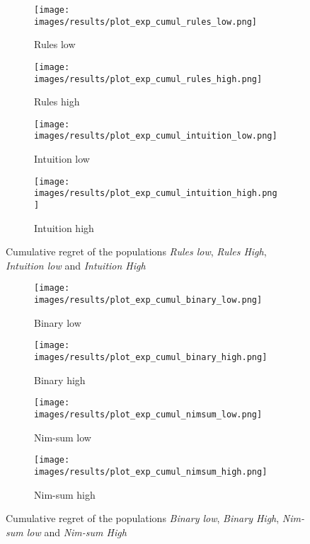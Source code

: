 \begin{figure}[ht]
	\begin{subfigure}{0.49\linewidth}
	\centering
	\texttt{[image: images/results/plot\_exp\_cumul\_rules\_low.png]}
	\caption{Rules low}
	\label{fig:exp_cumul_rules_low}
	\end{subfigure}
	\hfill
	\begin{subfigure}{0.49\linewidth}
	\centering
	\texttt{[image: images/results/plot\_exp\_cumul\_rules\_high.png]}
	\caption{Rules high}
	\label{fig:exp_cumul_rules_high}
	\end{subfigure}
	\begin{subfigure}{0.49\linewidth}
	\centering
	\texttt{[image: images/results/plot\_exp\_cumul\_intuition\_low.png]}
	\caption{Intuition low}
	\label{fig:exp_cumul_intuition_low}
	\end{subfigure}
	\hfill
	\begin{subfigure}{0.49\linewidth}
	\centering
	\texttt{[image: images/results/plot\_exp\_cumul\_intuition\_high.png]}
	\caption{Intuition high}
	\label{fig:exp_cumul_intuition_high}
	\end{subfigure}
	\caption{Cumulative regret of the populations \emph{Rules low}, \emph{Rules
	High}, \emph{Intuition low} and \emph{Intuition High}}
	\label{fig:exp_cumul1}
\end{figure}
\begin{figure}[ht]
	\begin{subfigure}{0.49\linewidth}
	\centering
	\texttt{[image: images/results/plot\_exp\_cumul\_binary\_low.png]}
	\caption{Binary low}
	\label{fig:exp_cumul_binary_low}
	\end{subfigure}
	\hfill
	\begin{subfigure}{0.49\linewidth}
	\centering
	\texttt{[image: images/results/plot\_exp\_cumul\_binary\_high.png]}
	\caption{Binary high}
	\label{fig:exp_cumul_binary_high}
	\end{subfigure}
	\begin{subfigure}{0.49\linewidth}
	\centering
	\texttt{[image: images/results/plot\_exp\_cumul\_nimsum\_low.png]}
	\caption{Nim-sum low}
	\label{fig:exp_cumul_nimsum_low}
	\end{subfigure}
	\hfill
	\begin{subfigure}{0.49\linewidth}
	\centering
	\texttt{[image: images/results/plot\_exp\_cumul\_nimsum\_high.png]}
	\caption{Nim-sum high}
	\label{fig:exp_cumul_nimsum_high}
	\end{subfigure}
	\caption{Cumulative regret of the populations \emph{Binary low},
	\emph{Binary High}, \emph{Nim-sum low} and \emph{Nim-sum High}}
	\label{fig:exp_cumul2}
\end{figure}


